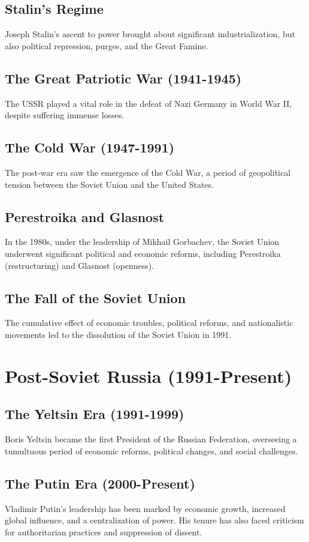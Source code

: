 \documentclass{book}
\begin{document}
\subsection{Stalin’s Regime}
Joseph Stalin’s ascent to power brought about significant industrialization, but also political repression, purges, and the Great Famine.

\subsection{The Great Patriotic War (1941-1945)}
The USSR played a vital role in the defeat of Nazi Germany in World War II, despite suffering immense losses.

\subsection{The Cold War (1947-1991)}
The post-war era saw the emergence of the Cold War, a period of geopolitical tension between the Soviet Union and the United States.

\subsection{Perestroika and Glasnost}
In the 1980s, under the leadership of Mikhail Gorbachev, the Soviet Union underwent significant political and economic reforms, including Perestroika (restructuring) and Glasnost (openness).

\subsection{The Fall of the Soviet Union}
The cumulative effect of economic troubles, political reforms, and nationalistic movements led to the dissolution of the Soviet Union in 1991.

\section{Post-Soviet Russia (1991-Present)}
\label{sec:post-soviet-russia}
\subsection{The Yeltsin Era (1991-1999)}
Boris Yeltsin became the first President of the Russian Federation, overseeing a tumultuous period of economic reforms, political changes, and social challenges.

\subsection{The Putin Era (2000-Present)}
Vladimir Putin’s leadership has been marked by economic growth, increased global influence, and a centralization of power. His tenure has also faced criticism for authoritarian practices and suppression of dissent.
\end{document}
